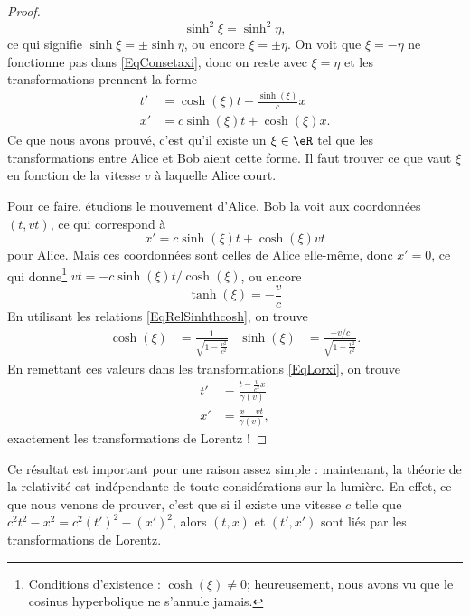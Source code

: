 \begin{proof}
	\[ 
	  \sinh^2\xi=\sinh^2\eta,
	\]
	ce qui signifie $\sinh\xi=\pm\sinh\eta$, ou encore $\xi=\pm\eta$. On voit que $\xi=-\eta$ ne fonctionne pas dans \eqref{EqConsetaxi}, donc on reste avec $\xi=\eta$ et les transformations prennent la forme
	\begin{equation}	\label{EqLorxi}
		\begin{split}
			t'&=\cosh(\xi) t+\frac{ \sinh(\xi) }{ c }x\\
			x'&=c\sinh(\xi) t+\cosh(\xi)x.
		\end{split}
	\end{equation}
	Ce que nous avons prouvé, c'est qu'il existe un $\xi\in\eR$ tel que les transformations entre Alice et Bob aient cette forme. Il faut trouver ce que vaut $\xi$ en fonction de la vitesse $v$ à laquelle Alice court.

	Pour ce faire, étudions le mouvement d'Alice. Bob la voit aux coordonnées $(t,vt)$, ce qui correspond à
	\[ 
	  x'=c\sinh(\xi)t+\cosh(\xi)vt
	\]
	pour Alice. Mais ces coordonnées sont celles de Alice elle-même, donc $x'=0$, ce qui donne\footnote{Conditions d'existence : $\cosh(\xi)\neq 0$; heureusement, nous avons vu que le cosinus hyperbolique ne s'annule jamais.} $vt=- c\sinh(\xi)t/ \cosh(\xi)$, ou encore
	\begin{equation}
		\tanh(\xi)=-\frac{ v }{ c }
	\end{equation}
	En utilisant les relations \eqref{EqRelSinhthcosh}, on trouve
	\begin{align}
		\cosh(\xi)&=\frac{1}{ \sqrt{1-\frac{ v^2 }{ c^2 }} }&\sinh(\xi)&=\frac{ -v/c }{ \sqrt{1-\frac{ v^2 }{ c^2 }} }.
	\end{align}
	En remettant ces valeurs dans les transformations \eqref{EqLorxi}, on trouve
	\begin{align}
		t'&=\frac{ t-\frac{ v }{ c^2 }x }{ \gamma(v) }\\
		x'&=\frac{ x-vt }{ \gamma(v) },
	\end{align}
	exactement les transformations de Lorentz !

\end{proof}


Ce résultat est important pour une raison assez simple : maintenant, la théorie de la relativité est indépendante de toute considérations sur la lumière. En effet, ce que nous venons de prouver, c'est que si il existe une vitesse $c$ telle que $c^2t^2-x^2=c^2(t')^2-(x')^2$, alors $(t,x)$ et $(t',x')$ sont liés par les transformations de Lorentz.

